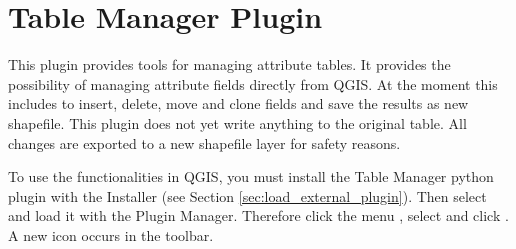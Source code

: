 
\section{Table Manager Plugin}\label{sec:ftools}

\updatedisclaimer

This plugin provides tools for managing attribute tables. It provides the
possibility of managing attribute fields directly from QGIS. At the moment
this includes to insert, delete, move and clone fields and save the results
as new shapefile. This plugin does not yet write anything to the original
table. All changes are exported to a new shapefile layer for safety reasons.


To use the functionalities in QGIS, you must install the Table Manager python
plugin with the  Installer (see Section
\ref{sec:load_external_plugin}). Then select and load it with the Plugin Manager.
Therefore click the menu  \arrow
{}, select  and click
. A new  icon occurs
in the toolbar.
